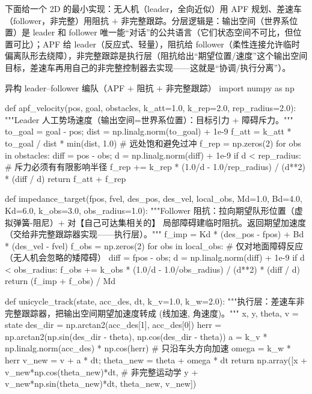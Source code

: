 \noindent 下面给一个 2D 的最小实现：无人机（leader，全向近似）用 APF 规划、差速车（follower，非完整）用阻抗 $+$ 非完整跟踪。分层逻辑是：输出空间（世界系位置）是 leader 和 follower 唯一能“对话”的公共语言（它们状态空间不可比，但位置可比）；APF 给 leader（反应式、轻量），阻抗给 follower（柔性连接允许临时偏离队形去绕障），非完整跟踪是执行层（阻抗给出“期望位置/速度”这个输出空间目标，差速车再用自己的非完整控制器去实现——这就是“协调/执行分离”）。

\begin{codebox}[Python]{异构 leader--follower 编队（APF $+$ 阻抗 $+$ 非完整跟踪）}
import numpy as np

def apf_velocity(pos, goal, obstacles, k_att=1.0, k_rep=2.0, rep_radius=2.0):
    """Leader 人工势场速度（输出空间=世界系位置）：目标引力 + 障碍斥力。"""
    to_goal = goal - pos; dist = np.linalg.norm(to_goal) + 1e-9
    f_att = k_att * to_goal / dist * min(dist, 1.0)       # 远处饱和避免过冲
    f_rep = np.zeros(2)
    for obs in obstacles:
        diff = pos - obs; d = np.linalg.norm(diff) + 1e-9
        if d < rep_radius:                                # 斥力必须有有限影响半径
            f_rep += k_rep * (1.0/d - 1.0/rep_radius) / (d**2) * (diff / d)
    return f_att + f_rep

def impedance_target(fpos, fvel, des_pos, des_vel, local_obs,
                     Md=1.0, Bd=4.0, Kd=6.0, k_obs=3.0, obs_radius=1.0):
    """Follower 阻抗：拉向期望队形位置（虚拟弹簧-阻尼）+ 对【自己可达集相关的】
       局部障碍建临时阻抗。返回期望加速度（交给非完整跟踪器实现——执行层）。"""
    f_imp = Kd * (des_pos - fpos) + Bd * (des_vel - fvel)
    f_obs = np.zeros(2)
    for obs in local_obs:                                 # 仅对地面障碍反应（无人机会忽略的矮障碍）
        diff = fpos - obs; d = np.linalg.norm(diff) + 1e-9
        if d < obs_radius:
            f_obs += k_obs * (1.0/d - 1.0/obs_radius) / (d**2) * (diff / d)
    return (f_imp + f_obs) / Md

def unicycle_track(state, acc_des, dt, k_v=1.0, k_w=2.0):
    """执行层：差速车非完整跟踪器，把输出空间期望加速度转成 (线加速, 角速度)。"""
    x, y, theta, v = state
    des_dir = np.arctan2(acc_des[1], acc_des[0])
    herr = np.arctan2(np.sin(des_dir - theta), np.cos(des_dir - theta))
    a = k_v * np.linalg.norm(acc_des) * np.cos(herr)      # 只沿车头方向加速
    omega = k_w * herr
    v_new = v + a * dt; theta_new = theta + omega * dt
    return np.array([x + v_new*np.cos(theta_new)*dt,      # 非完整运动学
                     y + v_new*np.sin(theta_new)*dt, theta_new, v_new])
\end{codebox}

